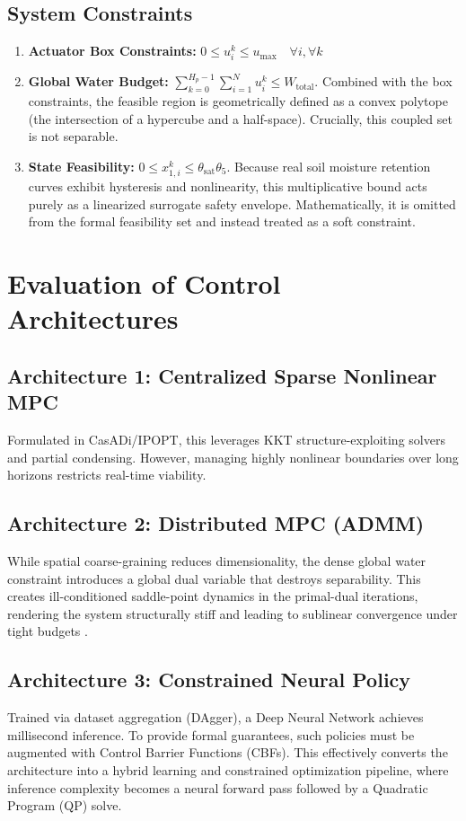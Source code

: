 \documentclass[11pt, a4paper]{article}
\begin{document}
\subsection{System Constraints}
\begin{enumerate}
    \item \textbf{Actuator Box Constraints:} $0 \leq u_i^k \leq u_{\text{max}} \quad \forall i, \forall k$
    \item \textbf{Global Water Budget:} $\sum_{k=0}^{H_p-1} \sum_{i=1}^N u_i^k \leq W_{\text{total}}$. Combined with the box constraints, the feasible region is geometrically defined as a convex polytope (the intersection of a hypercube and a half-space). Crucially, this coupled set is not separable.
    \item \textbf{State Feasibility:} $0 \leq x_{1, i}^k \leq \theta_{\text{sat}} \theta_5$. Because real soil moisture retention curves exhibit hysteresis and nonlinearity, this multiplicative bound acts purely as a linearized surrogate safety envelope. Mathematically, it is omitted from the formal feasibility set and instead treated as a soft constraint.
\end{enumerate}

\section{Evaluation of Control Architectures}
\label{sec:architectures}

\subsection{Architecture 1: Centralized Sparse Nonlinear MPC}
Formulated in CasADi/IPOPT, this leverages KKT structure-exploiting solvers and partial condensing. However, managing highly nonlinear boundaries over long horizons restricts real-time viability.

\subsection{Architecture 2: Distributed MPC (ADMM)}
While spatial coarse-graining reduces dimensionality, the dense global water constraint introduces a global dual variable that destroys separability. This creates ill-conditioned saddle-point dynamics in the primal-dual iterations, rendering the system structurally stiff and leading to sublinear convergence under tight budgets .

\subsection{Architecture 3: Constrained Neural Policy}
Trained via dataset aggregation (DAgger), a Deep Neural Network achieves millisecond inference. To provide formal guarantees, such policies must be augmented with Control Barrier Functions (CBFs). This effectively converts the architecture into a hybrid learning and constrained optimization pipeline, where inference complexity becomes a neural forward pass followed by a Quadratic Program (QP) solve.
\end{document}
